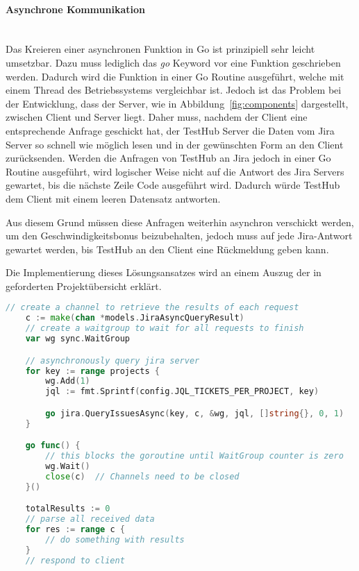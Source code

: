 \paragraph{Asynchrone Kommunikation}\hfill\\
Das Kreieren einer asynchronen Funktion in Go ist prinzipiell sehr leicht umsetzbar.
Dazu muss lediglich das \textit{go} Keyword vor eine Funktion geschrieben werden.
Dadurch wird die Funktion in einer Go Routine ausgeführt, welche mit einem Thread 
des Betriebssystems vergleichbar ist. 
Jedoch ist das Problem bei der Entwicklung, dass der Server, wie in Abbildung~\ref{fig:components}
dargestellt, zwischen Client und Server liegt. Daher muss, nachdem der Client 
eine entsprechende Anfrage geschickt hat, der TestHub Server die Daten vom \gls{Jira} 
Server so schnell wie möglich lesen und in der gewünschten Form an den Client zurücksenden.
Werden die Anfragen von TestHub an \gls{Jira} jedoch in einer Go Routine ausgeführt, wird logischer Weise nicht
auf die Antwort des \gls{Jira} Servers gewartet, bis die nächste Zeile Code ausgeführt wird.
Dadurch würde TestHub dem Client mit einem leeren Datensatz antworten.

Aus diesem Grund müssen diese Anfragen weiterhin asynchron verschickt werden, um den Geschwindigkeitsbonus
beizubehalten, jedoch muss auf jede Jira-Antwort gewartet werden, bis TestHub an
den Client eine Rückmeldung geben kann.

Die Implementierung dieses Lösungsansatzes wird an einem Auszug der in 
geforderten Projektübersicht erklärt.


\begin{lstlisting}[caption=Go Umsetzung von asynchronen HTTP Anfragen (\textit{backend/api/api\_jira.go}), language=Go, label={asyncgo}]
    // create a channel to retrieve the results of each request
    c := make(chan *models.JiraAsyncQueryResult)
    // create a waitgroup to wait for all requests to finish
    var wg sync.WaitGroup

    // asynchronously query jira server
    for key := range projects {
        wg.Add(1)
        jql := fmt.Sprintf(config.JQL_TICKETS_PER_PROJECT, key)

        go jira.QueryIssuesAsync(key, c, &wg, jql, []string{}, 0, 1)
    }

    go func() {
        // this blocks the goroutine until WaitGroup counter is zero
        wg.Wait() 
        close(c)  // Channels need to be closed
    }()

    totalResults := 0
    // parse all received data
    for res := range c {
        // do something with results
    }
    // respond to client
\end{lstlisting}

